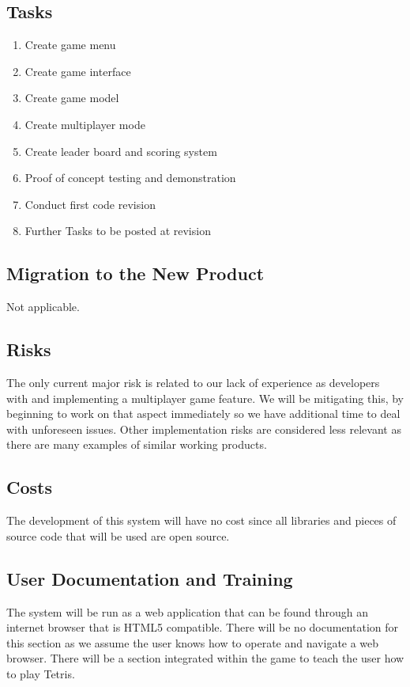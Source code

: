 \documentclass[12pt, titlepage]{article}
\begin{document}
\subsection{Tasks}
\begin{enumerate}
    \item Create game menu
    \item Create game interface
    \item Create game model 
    \item Create multiplayer mode
    \item Create leader board and scoring system
    \item Proof of concept testing and demonstration
    \item Conduct first code revision
    \item Further Tasks to be posted at revision
\end{enumerate}

\subsection{Migration to the New Product}
Not applicable.
\subsection{Risks}
The only current major risk is related to our lack of experience as developers with and implementing a multiplayer game feature. We will be mitigating this, by beginning to work on that aspect immediately so we have additional time to deal with unforeseen issues. Other implementation risks are considered less relevant as there are many examples of similar working products.
\subsection{Costs}
The development of this system will have no cost since all libraries and pieces of source code that will be used are open source. 
\subsection{User Documentation and Training}
The system will be run as a web application that can be found through an internet browser that is HTML5 compatible. There will be no documentation for this section as we assume the user knows how to operate and navigate a web browser. There will be a section integrated within the game to teach the user how to play Tetris.
\end{document}
